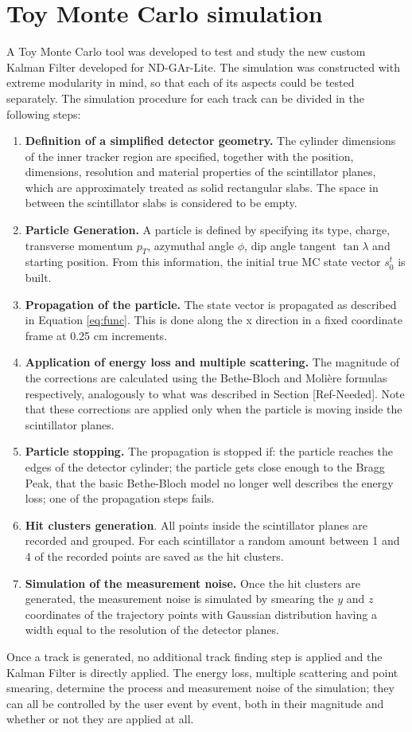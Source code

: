 \section{Toy Monte Carlo simulation}
\label{Sec:ToySim-Lite}

A Toy Monte Carlo tool was developed to test and study the new custom Kalman Filter developed for ND-GAr-Lite. The simulation was constructed with extreme modularity in mind, so that each of its aspects could be tested separately. The simulation procedure for each track can be divided in the following steps:
\begin{enumerate}
    \item \textbf{Definition of a simplified detector geometry.} The cylinder dimensions of the inner tracker region are specified, together with the position, dimensions, resolution  and material properties of the scintillator planes, which are approximately treated as solid rectangular slabs. The space in between the scintillator slabs is considered to be empty.
    \item \textbf{Particle Generation.} A particle is defined by specifying its type, charge, transverse momentum $p_T$, azymuthal angle $\phi$, dip angle tangent $\tan\lambda$ and starting position. From this information, the initial true MC state vector $s_0^t$ is built.
    \item \textbf{Propagation of the particle.} The state vector is propagated as described in Equation \ref{eq:func}. This is done along the x direction in a fixed coordinate frame at 0.25 cm increments. 
    \item \textbf{Application of energy loss and multiple scattering.} The magnitude of the corrections are calculated using the Bethe-Bloch and Molière formulas respectively, analogously to what was described in Section [Ref-Needed]. Note that these corrections are applied only when the particle is moving inside the scintillator planes.
    \item \textbf{Particle stopping.} The propagation is stopped if: the particle reaches the edges of the detector cylinder; the particle gets close enough to the Bragg Peak, that the basic Bethe-Bloch model no longer well describes the energy loss; one of the propagation steps fails.
    \item \textbf{Hit clusters generation}. All points inside the scintillator planes are recorded and grouped. For each scintillator a random amount between 1 and 4 of the recorded points are saved as the hit clusters. 
    \item \textbf{Simulation of the measurement noise.} Once the hit clusters are generated, the measurement noise is simulated by smearing the $y$ and $z$ coordinates of the trajectory points with Gaussian distribution having a width equal to the resolution of the detector planes. 
\end{enumerate}
Once a track is generated, no additional track finding step is applied and the Kalman Filter is directly applied. The energy loss, multiple scattering and point smearing, determine the process and measurement noise of the simulation; they can all be controlled by the user event by event, both in their magnitude and whether or not they are applied at all. 


